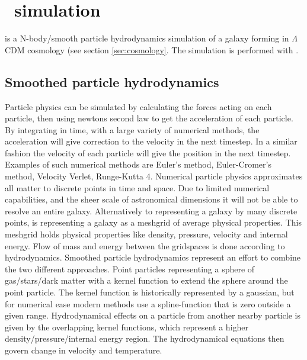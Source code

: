 \section{\eris\ simulation}

\eris{} is a N-body/smooth particle hydrodynamics simulation of a galaxy forming in $\Lambda$CDM cosmology (see section \ref{sec:cosmology}. The simulation is performed with \gasoline{}.



\subsection{Smoothed particle hydrodynamics}
Particle physics can be simulated by calculating the forces acting on each particle, then using newtons second law to get the acceleration of each particle.
By integrating in time, with a large variety of numerical methods, the acceleration will give correction to the velocity in the next timestep.
In a similar fashion the velocity of each particle will give the position in the next timestep.
Examples of such numerical methods are Euler's method, Euler-Cromer's method, Velocity Verlet, Runge-Kutta 4.
Numerical particle physics approximates all matter to discrete points in time and space. Due to limited numerical capabilities, and the sheer scale of astronomical dimensions it will not be able to resolve an entire galaxy.
Alternatively to representing a galaxy by many discrete points, is representing a galaxy as a meshgrid of average physical properties.
This meshgrid holds physical properties like density, pressure, velocity and internal energy. Flow of mass and energy between the gridspaces is done according to hydrodynamics.
Smoothed particle hydrodynamics  represent an effort to combine the two different approaches. Point particles representing a sphere of gas/stars/dark matter with a kernel function to extend the sphere around the point particle.
The kernel function is historically represented by a gaussian, but for numerical ease modern methods use a spline-function that is zero outside a given range.
Hydrodynamical effects on a particle from another nearby particle is given by the overlapping kernel functions, which represent a higher density/pressure/internal energy region. The hydrodynamical equations then govern change in velocity and temperature.

